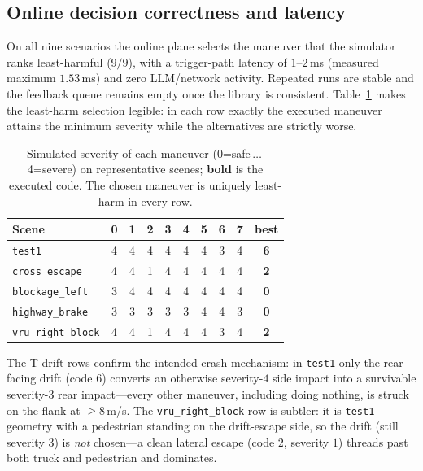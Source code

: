 \documentclass[conference]{IEEEtran}
\begin{document}
\subsection{Online decision correctness and latency}
On all nine scenarios the online plane selects the maneuver that the
simulator ranks least-harmful ($9/9$), with a trigger-path latency of
$1$--$2$\,ms (measured maximum $1.53$\,ms) and zero LLM/network activity.
Repeated runs are stable and the feedback queue remains empty once the
library is consistent. Table~\ref{tab:sevmatrix} makes the least-harm
selection legible: in each row exactly the executed maneuver attains the
minimum severity while the alternatives are strictly worse.

\begin{table}[t]
\caption{Simulated severity of each maneuver (0=safe\,$\dots$\,4=severe) on
representative scenes; \textbf{bold} is the executed code. The chosen maneuver
is uniquely least-harm in every row.}
\label{tab:sevmatrix}
\centering\footnotesize
\setlength{\tabcolsep}{3.4pt}
\begin{tabular}{@{}lccccccccc@{}}
\toprule
Scene & 0 & 1 & 2 & 3 & 4 & 5 & 6 & 7 & best\\
\midrule
\texttt{test1} & 4 & 4 & 4 & 4 & 4 & 4 & 3 & 4 & \textbf{6}\\
\texttt{cross\_escape} & 4 & 4 & 1 & 4 & 4 & 4 & 4 & 4 & \textbf{2}\\
\texttt{blockage\_left} & 3 & 4 & 4 & 4 & 4 & 4 & 4 & 4 & \textbf{0}\\
\texttt{highway\_brake} & 3 & 3 & 3 & 3 & 3 & 4 & 4 & 3 & \textbf{0}\\
\texttt{vru\_right\_block} & 4 & 4 & 1 & 4 & 4 & 4 & 3 & 4 & \textbf{2}\\
\bottomrule
\end{tabular}
\end{table}

The T-drift rows confirm the intended crash mechanism: in \texttt{test1} only
the rear-facing drift (code $6$) converts an otherwise severity-$4$ side
impact into a survivable severity-$3$ rear impact---every other maneuver,
including doing nothing, is struck on the flank at $\ge8$\,m/s. The
\texttt{vru\_right\_block} row is subtler: it is \texttt{test1} geometry with a
pedestrian standing on the drift-escape side, so the drift (still severity
$3$) is \emph{not} chosen---a clean lateral escape (code $2$, severity $1$)
threads past both truck and pedestrian and dominates.
\end{document}
